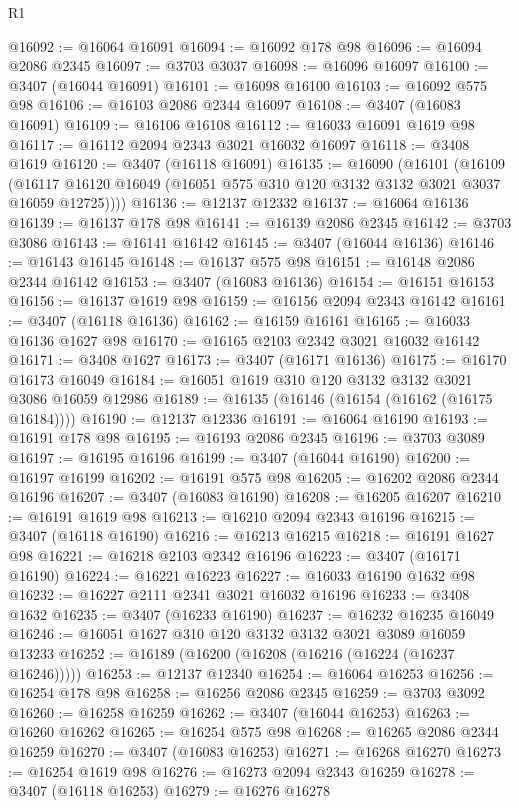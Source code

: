 \begin{lexlean}{R1}
\begin{coremodule}
@16092 := @16064 @16091
@16094 := @16092 @178 @98
@16096 := @16094 @2086 @2345
@16097 := @3703 @3037
@16098 := @16096 @16097
@16100 := @3407 (@16044 @16091)
@16101 := @16098 @16100
@16103 := @16092 @575 @98
@16106 := @16103 @2086 @2344 @16097
@16108 := @3407 (@16083 @16091)
@16109 := @16106 @16108
@16112 := @16033 @16091 @1619 @98
@16117 := @16112 @2094 @2343 @3021 @16032 @16097
@16118 := @3408 @1619
@16120 := @3407 (@16118 @16091)
@16135 := @16090
    (@16101
      (@16109 (@16117 @16120 @16049 (@16051 @575 @310 @120 @3132 @3132 @3021 @3037 @16059 @12725))))
@16136 := @12137 @12332
@16137 := @16064 @16136
@16139 := @16137 @178 @98
@16141 := @16139 @2086 @2345
@16142 := @3703 @3086
@16143 := @16141 @16142
@16145 := @3407 (@16044 @16136)
@16146 := @16143 @16145
@16148 := @16137 @575 @98
@16151 := @16148 @2086 @2344 @16142
@16153 := @3407 (@16083 @16136)
@16154 := @16151 @16153
@16156 := @16137 @1619 @98
@16159 := @16156 @2094 @2343 @16142
@16161 := @3407 (@16118 @16136)
@16162 := @16159 @16161
@16165 := @16033 @16136 @1627 @98
@16170 := @16165 @2103 @2342 @3021 @16032 @16142
@16171 := @3408 @1627
@16173 := @3407 (@16171 @16136)
@16175 := @16170 @16173 @16049
@16184 := @16051 @1619 @310 @120 @3132 @3132 @3021 @3086 @16059 @12986
@16189 := @16135 (@16146 (@16154 (@16162 (@16175 @16184))))
@16190 := @12137 @12336
@16191 := @16064 @16190
@16193 := @16191 @178 @98
@16195 := @16193 @2086 @2345
@16196 := @3703 @3089
@16197 := @16195 @16196
@16199 := @3407 (@16044 @16190)
@16200 := @16197 @16199
@16202 := @16191 @575 @98
@16205 := @16202 @2086 @2344 @16196
@16207 := @3407 (@16083 @16190)
@16208 := @16205 @16207
@16210 := @16191 @1619 @98
@16213 := @16210 @2094 @2343 @16196
@16215 := @3407 (@16118 @16190)
@16216 := @16213 @16215
@16218 := @16191 @1627 @98
@16221 := @16218 @2103 @2342 @16196
@16223 := @3407 (@16171 @16190)
@16224 := @16221 @16223
@16227 := @16033 @16190 @1632 @98
@16232 := @16227 @2111 @2341 @3021 @16032 @16196
@16233 := @3408 @1632
@16235 := @3407 (@16233 @16190)
@16237 := @16232 @16235 @16049
@16246 := @16051 @1627 @310 @120 @3132 @3132 @3021 @3089 @16059 @13233
@16252 := @16189 (@16200 (@16208 (@16216 (@16224 (@16237 @16246)))))
@16253 := @12137 @12340
@16254 := @16064 @16253
@16256 := @16254 @178 @98
@16258 := @16256 @2086 @2345
@16259 := @3703 @3092
@16260 := @16258 @16259
@16262 := @3407 (@16044 @16253)
@16263 := @16260 @16262
@16265 := @16254 @575 @98
@16268 := @16265 @2086 @2344 @16259
@16270 := @3407 (@16083 @16253)
@16271 := @16268 @16270
@16273 := @16254 @1619 @98
@16276 := @16273 @2094 @2343 @16259
@16278 := @3407 (@16118 @16253)
@16279 := @16276 @16278

\end{coremodule}
\end{lexlean}
